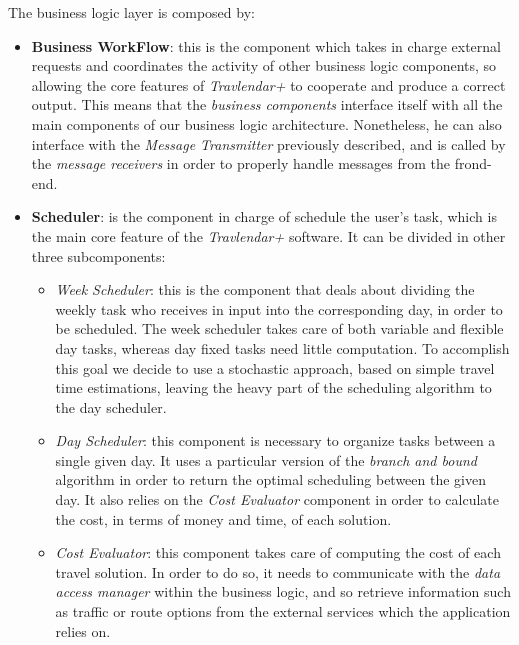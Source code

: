 The business logic layer is composed by:
\begin{itemize}
    \item \textbf{Business WorkFlow}: this is the component which takes in charge external requests and coordinates the activity of other business logic components, so allowing the core features of \emph{Travlendar+} to cooperate and produce a correct output. This means that the \emph{business components} interface itself with all the main components of our business logic architecture. Nonetheless, he can also interface with the \emph{Message Transmitter} previously described, and is called by the \emph{message receivers} in order to properly handle messages from the frond-end.
    
    \item \textbf{Scheduler}: is the component in charge of schedule the user's task, which is the main core feature of the \emph{Travlendar+} software. It can be divided in other three subcomponents:
            \begin{itemize}
            
                \item \textit{Week Scheduler}: this is the component that deals about dividing the weekly task who receives in input into the corresponding day, in order to be scheduled. The week scheduler takes care of both variable and flexible day tasks, whereas day fixed tasks need little computation.  To accomplish this goal we decide to use a stochastic approach, based on simple travel time estimations, leaving the heavy part of the scheduling algorithm to the day scheduler.
                
                \item \textit{Day Scheduler}: this component is necessary to organize tasks between a single given day. It uses a particular version of the \emph{branch and bound} algorithm in order to return the optimal scheduling between the given day. It also relies on the \emph{Cost Evaluator} component in order to calculate the cost, in terms of money and time, of each solution.
                
                \item \textit{Cost Evaluator}: this component takes care of computing the cost of each travel solution. In order to do so, it needs to communicate with the \emph{data access manager} within the business logic, and so retrieve information such as traffic or route options from the external services which the application relies on.
                

\end{itemize}
\end{itemize}
